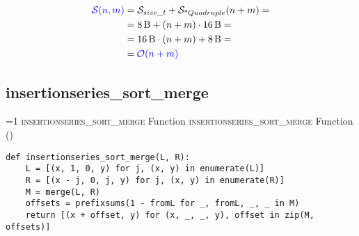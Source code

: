        \begin{frame}{\mergecostframe}
            \begin{align*}
                \textcolor{blue}{\mathcal{S}{\left(n, m\right)}} = & \; \mathcal{S}_{size\_t} + \mathcal{S}_{\text{*}Quadruple}{\left(n + m\right)} = \\
                = & \; \SI{8}{B} + \left(n + m\right) \cdot \SI{16}{B} = \\
                = & \; \SI{16}{B} \cdot \left(n + m\right) + \SI{8}{B} = \\
                = & \: \textcolor{blue}{\mathcal{O}{\left(n + m\right)}}
            \end{align*}
        \end{frame}



    \subsection{insertionseries\_sort\_merge}
\setcounter{insertionseriessortmergefunctioncounter}{1}
\newcommand{\insertionseriessortmergefunctionframe}{%
    \ifnum\value{insertionseriessortmergefunctioncounter}=1
        \textsc{insertionseries\_sort\_merge} Function%
    \else
        \textsc{insertionseries\_sort\_merge} Function (\theinsertionseriessortmergefunctioncounter)%
    \fi
}
        \begin{frame}[containsverbatim]{\insertionseriessortmergefunctionframe}
            \begin{verbatim} 
def insertionseries_sort_merge(L, R):
    L = [(x, 1, 0, y) for j, (x, y) in enumerate(L)]
    R = [(x - j, 0, j, y) for j, (x, y) in enumerate(R)]
    M = merge(L, R)
    offsets = prefixsums(1 - fromL for _, fromL, _, _ in M)
    return [(x + offset, y) for (x, _, _, y), offset in zip(M, offsets)]
                \end{verbatim}
        \end{frame}

